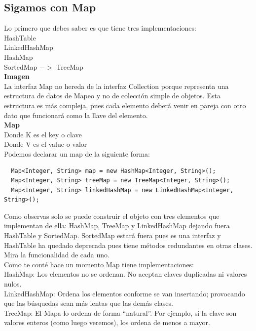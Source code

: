 \documentclass{article}
\begin{document}
\subsection*{Sigamos con Map}%
Lo primero que debes saber es que tiene tres implementaciones:\\

HashTable\\
LinkedHashMap\\
HashMap\\
SortedMap $->$ TreeMap\\



\textbf{Imagen}\\



La interfaz Map no hereda de la interfaz Collection porque representa una
estructura de datos de Mapeo y no de colección simple de objetos. Esta
estructura es más compleja, pues cada elemento deberá venir en pareja con otro
dato que funcionará como la llave del elemento.\\


\textbf{Map}\\
Donde K es el key o clave\\
Donde V es el value o valor\\

Podemos declarar un map de la siguiente forma:\\

\begin{verbatim}
  Map<Integer, String> map = new HashMap<Integer, String>();
  Map<Integer, String> treeMap = new TreeMap<Integer, String>();
  Map<Integer, String> linkedHashMap = new LinkedHashMap<Integer, String>();
\end{verbatim}

Como observas solo se puede construir el objeto con tres elementos que
implementan de ella: HashMap, TreeMap y LinkedHashMap dejando fuera HashTable y
SortedMap. SortedMap estará fuera pues es una interfaz y HashTable ha quedado
deprecada pues tiene métodos redundantes en otras clases. Mira la funcionalidad
de cada uno.\\

Como te conté hace un momento Map tiene implementaciones:\\

HashMap: Los elementos no se ordenan. No aceptan claves duplicadas ni valores
nulos.\\
LinkedHashMap: Ordena los elementos conforme se van insertando; provocando que
las búsquedas sean más lentas que las demás clases.\\
TreeMap: El Mapa lo ordena de forma “natural”. Por ejemplo, si la clave son
valores enteros (como luego veremos), los ordena de menos a mayor.\\
\end{document}
